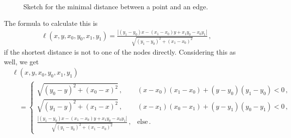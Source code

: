 \documentclass[notitlepage]{scrarticle}
\begin{document}
\begin{figure}[ht]
	\centering
	\caption{Sketch for the minimal distance between a point and an edge.}
	\label{fig:sketch_minimal_distance}
\end{figure}

The formula to calculate this is
%
\begin{align*}
	\ell(x,y,x_0,y_0,x_1,y_1)=\frac{|(y_1-y_0)x-(x_1-x_0)y+x_1y_0-x_0y_1|}{\sqrt{(y_1-y_0)^2+(x_1-x_0)^2}}\,,
\end{align*}
if the shortest distance is not to one of the nodes directly.
Considering this as well, we get
%
\begin{align*}
	 & \ell(x,y,x_0,y_0,x_1,y_1) \\
	 & \quad=
	\begin{cases}
		\sqrt{(y_0-y)^2+(x_0-x)^2}\,,                                                   & (x-x_0)(x_1-x_0)+(y-y_0)(y_1-y_0)<0\,, \\
		\sqrt{(y_1-y)^2+(x_1-x)^2}\,,                                                   & (x-x_1)(x_0-x_1)+(y-y_1)(y_0-y_1)<0\,, \\
		\frac{|(y_1-y_0)x-(x_1-x_0)y+x_1y_0-x_0y_1|}{\sqrt{(y_1-y_0)^2+(x_1-x_0)^2}}\,, & \text{else}\,.
	\end{cases}
\end{align*}
\end{document}
